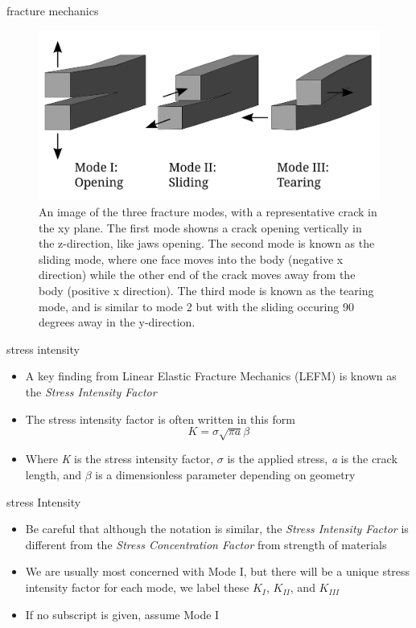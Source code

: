 \documentclass[
  letterpaper,
  ignorenonframetext,
  aspectratio=43,
  handout,
  12pt]{beamer}
\providecommand{\tightlist}{%
  \setlength{\itemsep}{0pt}\setlength{\parskip}{0pt}}
\providecommand{\tightlist}{%
\setlength{\itemsep}{0pt}\setlength{\parskip}{0pt}}
\let\Oldincludegraphics\includegraphics
\renewcommand{\includegraphics}[2][]{\Oldincludegraphics[width=\textwidth,height=0.7\textheight,keepaspectratio]{#2}}
\begin{document}
\begin{frame}{fracture mechanics}
\protect\hypertarget{fracture-mechanics-1}{}
\begin{figure}
\centering
\includegraphics{../images/Fracture_modes_v2.svg}
\caption{An image of the three fracture modes, with a representative
crack in the xy plane. The first mode showns a crack opening vertically
in the z-direction, like jaws opening. The second mode is known as the
sliding mode, where one face moves into the body (negative x direction)
while the other end of the crack moves away from the body (positive x
direction). The third mode is known as the tearing mode, and is similar
to mode 2 but with the sliding occuring 90 degrees away in the
y-direction.}
\end{figure}
\end{frame}

\begin{frame}{stress intensity}
\protect\hypertarget{stress-intensity}{}
\begin{itemize}
\tightlist
\item
  A key finding from Linear Elastic Fracture Mechanics (LEFM) is known
  as the \emph{Stress Intensity Factor}
\item
  The stress intensity factor is often written in this form
  \[ K = \sigma \sqrt{ \pi a} \beta \]
\item
  Where \emph{K} is the stress intensity factor, \(\sigma\) is the
  applied stress, \emph{a} is the crack length, and \(\beta\) is a
  dimensionless parameter depending on geometry
\end{itemize}
\end{frame}

\begin{frame}{stress Intensity}
\protect\hypertarget{stress-intensity-1}{}
\begin{itemize}
\tightlist
\item
  Be careful that although the notation is similar, the \emph{Stress
  Intensity Factor} is different from the \emph{Stress Concentration
  Factor} from strength of materials
\item
  We are usually most concerned with Mode I, but there will be a unique
  stress intensity factor for each mode, we label these \(K_I\),
  \(K_{II}\), and \(K_{III}\)
\item
  If no subscript is given, assume Mode I
\end{itemize}
\end{frame}
\end{document}
